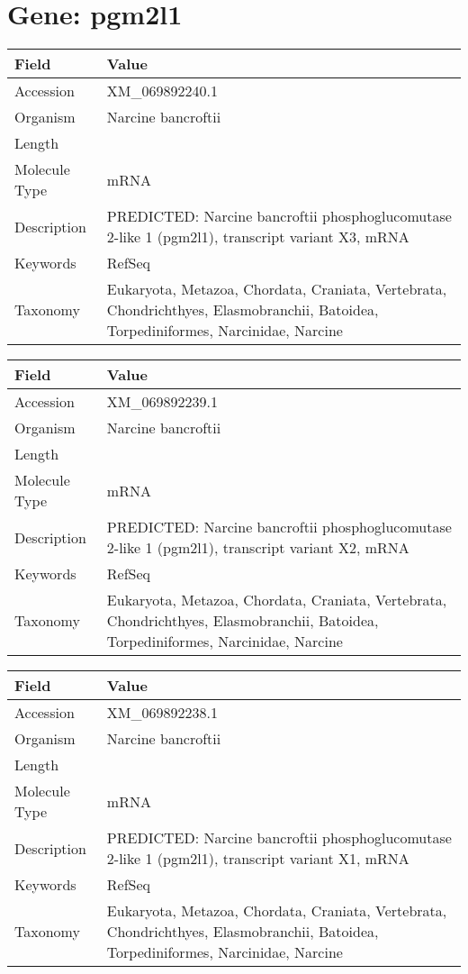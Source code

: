 \documentclass[10pt]{article}
\begin{document}
\section{Gene: pgm2l1}
{\footnotesize
\begin{longtable}{>{\raggedright\arraybackslash}p{4.5cm} >{\raggedright\arraybackslash}p{11.5cm}}
\textbf{Field} & \textbf{Value} \\
\hline
Accession & XM\_069892240.1 \\
Organism & Narcine bancroftii \\
Length & 7060 \\
Molecule Type & mRNA \\
Description & PREDICTED: Narcine bancroftii phosphoglucomutase 2-like 1 (pgm2l1), transcript variant X3, mRNA \\
Keywords & RefSeq \\
Taxonomy & Eukaryota, Metazoa, Chordata, Craniata, Vertebrata, Chondrichthyes, Elasmobranchii, Batoidea, Torpediniformes, Narcinidae, Narcine \\
\end{longtable}
}

\vspace{1em}
{\footnotesize
\begin{longtable}{>{\raggedright\arraybackslash}p{4.5cm} >{\raggedright\arraybackslash}p{11.5cm}}
\textbf{Field} & \textbf{Value} \\
\hline
Accession & XM\_069892239.1 \\
Organism & Narcine bancroftii \\
Length & 7228 \\
Molecule Type & mRNA \\
Description & PREDICTED: Narcine bancroftii phosphoglucomutase 2-like 1 (pgm2l1), transcript variant X2, mRNA \\
Keywords & RefSeq \\
Taxonomy & Eukaryota, Metazoa, Chordata, Craniata, Vertebrata, Chondrichthyes, Elasmobranchii, Batoidea, Torpediniformes, Narcinidae, Narcine \\
\end{longtable}
}

\vspace{1em}
{\footnotesize
\begin{longtable}{>{\raggedright\arraybackslash}p{4.5cm} >{\raggedright\arraybackslash}p{11.5cm}}
\textbf{Field} & \textbf{Value} \\
\hline
Accession & XM\_069892238.1 \\
Organism & Narcine bancroftii \\
Length & 7267 \\
Molecule Type & mRNA \\
Description & PREDICTED: Narcine bancroftii phosphoglucomutase 2-like 1 (pgm2l1), transcript variant X1, mRNA \\
Keywords & RefSeq \\
Taxonomy & Eukaryota, Metazoa, Chordata, Craniata, Vertebrata, Chondrichthyes, Elasmobranchii, Batoidea, Torpediniformes, Narcinidae, Narcine \\
\end{longtable}
}
\end{document}
